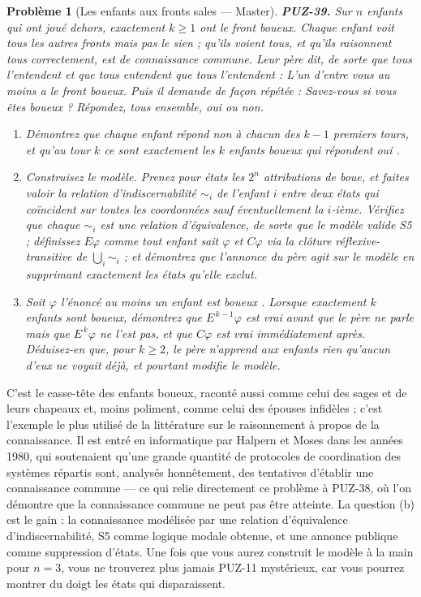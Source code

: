 \documentclass[11pt]{article}
\newtheorem{problem}{Problème}
\begin{document}
\begin{problem}[{Les enfants aux fronts sales --- Master}]
\textbf{PUZ-39.} Sur $ n $ enfants qui ont joué dehors, exactement $ k \ge 1 $ ont le
front boueux. Chaque enfant voit tous les autres fronts mais pas le sien ; qu'ils voient tous,
et qu'ils raisonnent tous correctement, est de connaissance commune. Leur père dit, de sorte
que tous l'entendent et que tous entendent que tous l'entendent : \og{} L'un d'entre vous au moins
a le front boueux. \fg{} Puis il demande de façon répétée : \og{} Savez-vous si vous êtes boueux ?
Répondez, tous ensemble, oui ou non. \fg{}
\begin{enumerate}
\item[(a)] Démontrez que chaque enfant répond \og{} non \fg{} à chacun des $ k-1 $ premiers tours, et
qu'au tour $ k $ ce sont exactement les $ k $ enfants boueux qui répondent \og{} oui \fg{}.
\item[(b)] Construisez le modèle. Prenez pour états les $ 2^{n} $ attributions de boue, et faites
valoir la relation d'indiscernabilité $ \sim_i $ de l'enfant $ i $ entre deux états qui
coïncident sur toutes les coordonnées sauf éventuellement la $ i $-ième. Vérifiez que
chaque $ \sim_i $ est une relation d'équivalence, de sorte que le modèle valide S5 ;
définissez $ E\varphi $ comme \og{} tout enfant sait $ \varphi $ \fg{} et $ C\varphi $ via la
clôture réflexive-transitive de $ \bigcup_i \sim_i $ ; et démontrez que l'annonce du père
agit sur le modèle en supprimant exactement les états qu'elle exclut.
\item[(c)] Soit $ \varphi $ l'énoncé \og{} au moins un enfant est boueux \fg{}. Lorsque exactement
$ k $ enfants sont boueux, démontrez que $ E^{\,k-1}\varphi $ est vrai avant que le père
ne parle mais que $ E^{\,k}\varphi $ ne l'est pas, et que $ C\varphi $ est vrai
immédiatement après. Déduisez-en que, pour $ k \ge 2 $, le père n'apprend aux enfants rien
qu'aucun d'eux ne voyait déjà, et pourtant modifie le modèle.
\end{enumerate}

\end{problem}

\noindent C'est le casse-tête des enfants boueux, raconté aussi comme celui des
sages et de leurs chapeaux et, moins poliment, comme celui des épouses infidèles ; c'est
l'exemple le plus utilisé de la littérature sur le raisonnement à propos de la connaissance.
Il est entré en informatique par Halpern et Moses dans les années 1980, qui soutenaient
qu'une grande quantité de protocoles de coordination des systèmes répartis sont, analysés
honnêtement, des tentatives d'établir une connaissance commune --- ce qui relie directement ce
problème à PUZ-38, où l'on démontre que la connaissance commune ne peut pas être atteinte. La
question (b) est le gain : la connaissance modélisée par une relation d'équivalence
d'indiscernabilité, S5 comme logique modale obtenue, et une annonce publique comme
suppression d'états. Une fois que vous aurez construit le modèle à la main pour $ n = 3 $,
vous ne trouverez plus jamais PUZ-11 mystérieux, car vous pourrez montrer du doigt les états
qui disparaissent.
\end{document}
